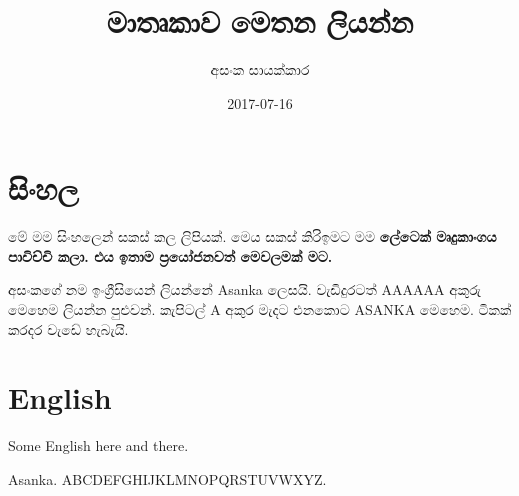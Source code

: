 \documentclass[12pt]{article}
\title{මාතෘකාව මෙතන ලියන්න}
\author{අසංක සායක්කාර}
\date{2017-07-16}
\begin{document}
\maketitle

\section{සිංහල}

මේ මම සිංහලෙන් සකස් කල ලිපියක්. මෙය සකස් කිරිඉමට මම \bf{ලේටෙක්} මෘදුකාංගය පාවිච්චි කලා. එය ඉතාම ප්‍රයෝජනවත් මෙවලමක් මට.

අසංකගේ නම ඉංග්‍රීසියෙන් ලියන්නේ {\uctimes A}sanka ලෙසයි. 
වැඩිදුරටත් {\uctimes AAAAAA} අකුරු මෙහෙම ලියන්න පුළුවන්.
කැපිටල් {\uctimes A} අකුර මැදට එනකොට {\uctimes A}S{\uctimes A}NK{\uctimes A} මෙහෙම. ටිකක් කරදර වැඩේ හැබැයි.

\section{English}

Some English here and there.

{\uctimes A}sanka. {\uctimes A}BCDEFGHIJKLMNOPQRSTUVWXYZ.
\end{document}
